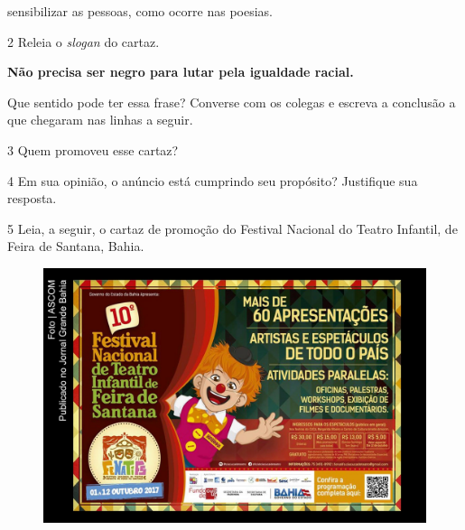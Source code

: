 \begin{conteudo}
\begin{conteudo}
\begin{conteudo}
\begin{conteudo}
\begin{escolha}
\begin{boxlist}
 sensibilizar as pessoas, como ocorre nas poesias.
\end{boxlist}
\end{escolha}

\num{2} Releia o \emph{slogan} do cartaz.

\begin{myquote}
\textbf{Não precisa ser negro para lutar pela igualdade racial.}
\end{myquote}

Que sentido pode ter essa frase? Converse com os colegas e escreva a
conclusão a que chegaram nas linhas a seguir.


\num{3} Quem promoveu esse cartaz?


\num{4} Em sua opinião, o anúncio está cumprindo seu propósito? Justifique 
sua resposta.


\pagebreak
\num{5} Leia, a seguir, o cartaz de promoção do Festival Nacional do Teatro
Infantil, de Feira de Santana, Bahia.

\begin{figure}[htpb!]
\includegraphics[width=\textwidth]{media/image15.jpeg}
\end{figure}


\end{conteudo}
\end{conteudo}
\end{conteudo}
\end{conteudo}
